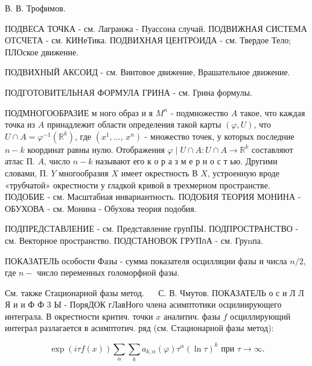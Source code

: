 \documentclass[10pt]{article}
\begin{document}
В. В. Трофимов.



ПОДВЕСА ТОЧКА - см. Лагранжа - Пуассона случай. ПОДВИЖНАЯ СИСТЕМА ОТСЧЕТА - см. КИНеТика. ПОДВИХНАЯ ЦЕНТРОИДА - см. Твердое Тело; ПЛОское движение.



ПОДВИХНЫЙ АКСОИД - см. Винтовое движение, Врашательное движение.



ПОДГОТОВИТЕЛЬНАЯ ФОРМУЛА ГРИНА - см. Грина формулы.



ПОДМНОГООБРАЗИЕ м ного образ и я $M^{n}$ - подмножество $A$ такое, что каждая точка из $A$ принадлежит области определения такой карты $(\varphi, U)$, что $U \cap A=\varphi^{-1}\left(\mathbb{R}^{k}\right)$, где $\left(x^{1}, \ldots\right.$, $\left.x^{n}\right)$ - множество точек, у которых последние $n-k$ координат равны нулю. Отображения $\varphi \mid U \cap A: U \cap A \rightarrow \mathbb{R}^{k}$ составляют атлас П. $A$, число $n-k$ называют его к о р а $з$ м е р н о с т ью. Другими словами, П. $Y$ многообразия $X$ имеет окрестность В $X$, устроенную вроде «трубчатой» окрестности у гладкой кривой в трехмерном пространстве. ПОДОБИЕ - см. Масштабная инвариантность. ПОДОБИЯ ТЕОРИЯ МОНИНА - ОБУХОВА - см. Монина - Обухова теория подобия.



ПОДПРЕДСТАВЛЕНИЕ - см. Представление групПЫ. ПОДПРОСТРАНСТВО - см. Векторное пространство. ПОДСТАНОВОК ГРУПกА - см. Груnпа.



ПОКАЗАТЕЛЬ особости Фазы - сумма показателя осцилляции фазы и числа $n / 2$, где $n-$ число переменных голоморфной фазы.



См. также Стационарной фазы метод. $\quad$ С. В. Чмутов. ПОКАЗАТЕЛЬ о с и Л Л Я и и Ф Ф 3 Ы - ПоряДОК гЛавНого члена асимптотики осцилиирующего интеграла. В окрестности критич. точки $x$ аналитич. фазы $f$ осциллирующий интеграл разлагается в асимптотич. ряд (см. Стационарной фазы метод):



\[

\exp (i \tau f(x)) \sum_{\alpha} \sum_{k} a_{k, \alpha}(\varphi) \tau^{\alpha}(\ln \tau)^{k} \text { при } \tau \rightarrow \infty .

\]
\end{document}

